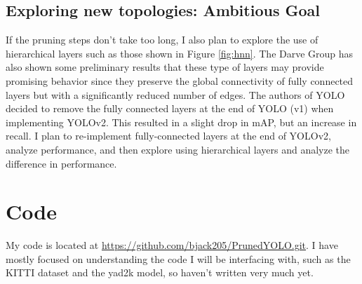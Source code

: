 \documentclass[10pt,letterpaper]{article}
\begin{document}
	\subsection{Exploring new topologies: Ambitious Goal}
	If the pruning steps don't take too long, I also plan to explore the use of hierarchical layers such as those shown in Figure \ref{fig:hnn}. The Darve Group has also shown some preliminary results that these type of layers may provide promising  behavior since they preserve the global connectivity of fully connected layers but with a significantly reduced number of edges. The authors of YOLO decided to remove the fully connected layers at the end of YOLO (v1) when implementing YOLOv2. This resulted in a slight drop in mAP, but an increase in recall. I plan to re-implement fully-connected layers at the end of YOLOv2, analyze performance, and then explore using hierarchical layers and analyze the difference in performance. 
	
	\section*{Code}
	My code is located at \url{https://github.com/bjack205/PrunedYOLO.git}. I have mostly focused on understanding the code I will be interfacing with, such as the KITTI dataset and the yad2k model, so haven't written very much yet.
	
	\printbibliography
	
	
	
	
	
\end{document}
